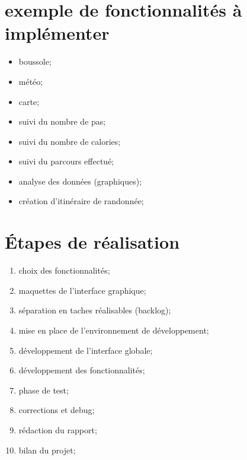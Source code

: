 \documentclass[11pt]{article}
\begin{document}
\section{exemple de fonctionnalités à implémenter}
	\begin{itemize}
		\item boussole;
		\item météo;
		\item carte;
		\item suivi du nombre de pas;
		\item suivi du nombre de calories;
		\item suivi du parcours effectué;
		\item analyse des données (graphiques);
		\item création d'itinéraire de randonnée;
	\end{itemize}
	
\section{Étapes de réalisation}
	\begin{enumerate}
		\item choix des fonctionnalités;
		\item maquettes de l'interface graphique;
		\item séparation en taches réalisables (backlog);
		\item mise en place de l'environnement de développement;
		\item développement de l'interface globale;
		\item développement des fonctionnalités;
		\item phase de test;
		\item corrections et debug;
		\item rédaction du rapport;
		\item bilan du projet;
	\end{enumerate}
\end{document}
